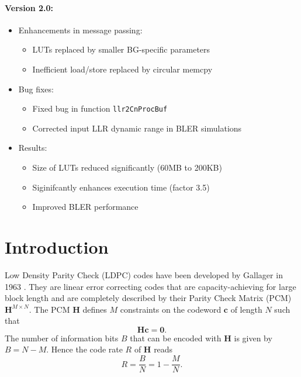 \documentclass{article}
\def\0{\mathbf{0}}
\def\c{\mathbf{c}}
\def\H{\mathbf{H}}
\begin{document}
\paragraph{Version 2.0:}
\begin{itemize}
\item Enhancements in message passing:
  \begin{itemize}
  \item LUTs replaced by smaller BG-specific parameters
  \item Inefficient load/store replaced by circular memcpy
  \end{itemize}
\item Bug fixes:
  \begin{itemize}
  \item Fixed bug in function \texttt{llr2CnProcBuf}
  \item Corrected input LLR dynamic range in BLER simulations
  \end{itemize}
\item Results:
  \begin{itemize}
  \item Size of LUTs reduced significantly (60MB to 200KB)
  \item Siginifcantly enhances execution time (factor 3.5)
  \item Improved BLER performance
  \end{itemize}
\end{itemize}


\newpage
\tableofcontents

\newpage
\section{Introduction}
\label{sec:introduction}

Low Density Parity Check (LDPC) codes have been developed by Gallager in 1963 \cite{gallager1962low}. They are linear error correcting codes that are capacity-achieving for large block length and are completely described by their Parity Check Matrix (PCM) $\H^{M\times N}$. The PCM $\H$ defines $M$ constraints on the codeword $\c$ of length $N$ such that
\begin{equation}
  \label{eq:29}
  \H\c = \0.
\end{equation}
The number of information bits $B$ that can be encoded with $\H$ is given by $B=N-M$. Hence the code rate $R$ of $\H$ reads
\begin{equation}
  \label{eq:37}
  R = \frac{B}{N} = 1-\frac{M}{N}.
\end{equation}
\end{document}
